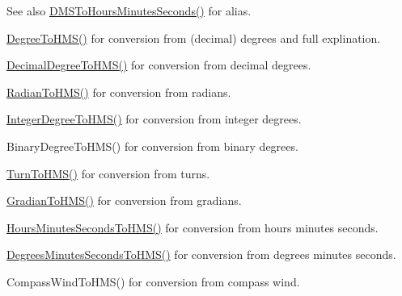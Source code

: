 \begin{DoxySeeAlso}{See also}
\mbox{\hyperlink{group___e_g_x_math-_angle_conversions-_d_m_s_ga62f95d8bf79b8788ef6d1003f8d6a65f}{D\+M\+S\+To\+Hours\+Minutes\+Seconds()}} for alias. 

\mbox{\hyperlink{group___e_g_x_math-_angle_conversions-_degree_ga0bb223ca6e77b00439a6d910ab32d82e}{Degree\+To\+H\+M\+S()}} for conversion from (decimal) degrees and full explination. 

\mbox{\hyperlink{group___e_g_x_math-_angle_conversions-_decimal_degree_ga981b48f16766590641360ca98dfa7b8c}{Decimal\+Degree\+To\+H\+M\+S()}} for conversion from decimal degrees. 

\mbox{\hyperlink{group___e_g_x_math-_angle_conversions-_radian_ga55b5fba9307f34ab8db57391789a90cc}{Radian\+To\+H\+M\+S()}} for conversion from radians. 

\mbox{\hyperlink{group___e_g_x_math-_angle_conversions-_integer_degree_gae6b79bd5a92f8c6942b9fc2c50695e6a}{Integer\+Degree\+To\+H\+M\+S()}} for conversion from integer degrees. 

Binary\+Degree\+To\+H\+M\+S() for conversion from binary degrees. 

\mbox{\hyperlink{group___e_g_x_math-_angle_conversions-_turn_ga74efaece2f95aa6671f18382e5f3925f}{Turn\+To\+H\+M\+S()}} for conversion from turns. 

\mbox{\hyperlink{group___e_g_x_math-_angle_conversions-_gradian_ga6513a992679fbb97d2969cf8bd68306f}{Gradian\+To\+H\+M\+S()}} for conversion from gradians. 

\mbox{\hyperlink{group___e_g_x_math-_angle_conversions-_hours_minutes_seconds_ga5ac65e4e7ed8857151b3f81f5928df3a}{Hours\+Minutes\+Seconds\+To\+H\+M\+S()}} for conversion from hours minutes seconds. 

\mbox{\hyperlink{group___e_g_x_math-_angle_conversions-_degrees_minutes_seconds_ga63c1cd3c9048d0c5a80fd9bc851c38ac}{Degrees\+Minutes\+Seconds\+To\+H\+M\+S()}} for conversion from degrees minutes seconds. 

Compass\+Wind\+To\+H\+M\+S() for conversion from compass wind. 
\end{DoxySeeAlso}
\mbox{\label{group___e_g_x_math-_angle_conversions-_d_m_s_ga62f95d8bf79b8788ef6d1003f8d6a65f}} 
